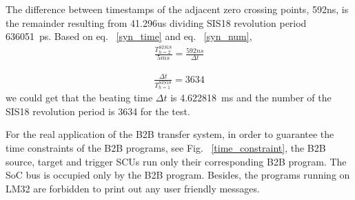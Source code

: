 The difference between timestamps of the adjacent zero crossing points, 592ns, is the remainder resulting from 41.296us dividing SIS18 revolution period \SI{636051}{\ps}. Based on eq. ~\ref{syn_time} and eq. ~\ref{syn_num}, 
\begin{equation}
\begin{aligned}
\frac{T^{SIS18}_{h=2}}{5ms}=\frac{592ns}{\Delta t}
\label {syn_time}
\end{aligned}
\end{equation}

\begin{equation}
\begin{aligned}
\frac{\Delta t}{T^{SIS18}_{h=1}}=3634
\label {syn_num}
\end{aligned}
\end{equation}
we could get that the beating time $\Delta t$ is \SI{4.622818}{\ms} and the number of the SIS18 revolution period is 3634 for the test. 

For the real application of the B2B transfer system, in order to guarantee the time constraints of the B2B programs, see Fig. ~\ref{time_constraint}, the B2B source, target and trigger SCUs run only their corresponding B2B program. The SoC bus is occupied only by the B2B program. Besides, the programs running on LM32 are forbidden to print out any user friendly messages.




